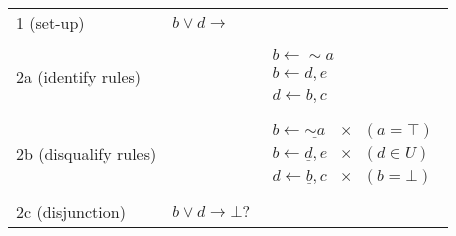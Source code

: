 \documentclass[9pt,a4paper,landscape]{article}
\begin{document}
{\begin{center}
\begin{tabular}{p{3cm}p{5cm}p{6cm}}
		1 (set-up) & $b \lor d \rightarrow$ & \\ & \\
		2a (identify rules) &  & $\begin{array}{l}
		b \leftarrow {\sim} a\\
		b \leftarrow d, e\\
		d \leftarrow b, c
		\end{array}$  \\ & \\
		2b (disqualify rules) &  & $\begin{array}{ll}
		b \leftarrow \underline{{\sim} a} & \times \hspace{8pt} (a = \top) \\
		b \leftarrow \underline{d}, e & \times \hspace{8pt} (d \in U) \\
		d \leftarrow \underline{b}, c & \times \hspace{8pt} (b = \bot) 
		\end{array}$  \\ & \\
		2c (disjunction) & $b \lor d \rightarrow \bot ?$ \\ \midrule

\end{tabular}
\end{center}}
\end{document}
